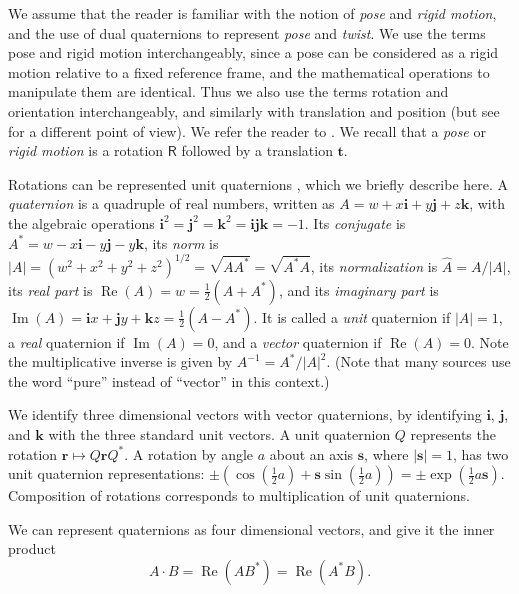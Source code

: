 \documentclass[reqno,12pt]{amsart}
\newcommand\bi{\bm i}
\newcommand\bj{\bm j}
\newcommand\bk{\bm k}
\DeclareMathOperator\realpart{Re}
\DeclareMathOperator\imagpart{Im}
\begin{document}
We assume that the reader is familiar with the notion of \emph{pose} and \emph{rigid motion}, and the use of dual quaternions to represent \emph{pose} and \emph{twist}.  We use the terms pose and rigid motion interchangeably, since a pose can be considered as a rigid motion relative to a fixed reference frame, and the mathematical operations to manipulate them are identical.  Thus we also use the terms rotation and orientation interchangeably, and similarly with translation and position (but see \cite{chirikjian-et-al} for a different point of view).  We refer the reader to \cite{adorno,agrawal,bottema-et-al,clifford,dooley-et-al,gallardo-alvarado,han-et-al,kavan-et-al,kavan-et-al-2,kenwright,kussaba-et-al,montgomery-smith-et-al,perez-et-al,schilling1,schilling2,selig-book,silva-et-al,spong-et-al,wang-et-al}.  We recall that a \emph{pose} or \emph{rigid motion} is a rotation $\mathsf R$ followed by a translation $\bm t$.

Rotations can be represented unit quaternions \cite{quaternions1,quaternions2}, which we briefly describe here.  A \emph{quaternion} is a quadruple of real numbers, written as $A = w + x \bi + y \bj + z \bk$, with the algebraic operations $\bi^2 = \bj^2 = \bk^2 = \bi \bj \bk = -1$.  Its \emph{conjugate} is $A^* = w - x \bi - y \bj - y \bk$, its \emph{norm} is $|A| = (w^2+x^2+y^2+z^2)^{1/2} = \sqrt{A A^*} = \sqrt{A^* A}$, its \emph{normalization} is $\widehat A = A/|A|$, its \emph{real part} is $\realpart(A) = w = \tfrac12(A + A^*)$, and its \emph{imaginary part} is $\imagpart(A) = \bi x + \bj y + \bk z = \tfrac12(A - A^*)$.  It is called a \emph{unit} quaternion if $|A| = 1$, a \emph{real} quaternion if $\imagpart(A) = 0$, and a \emph{vector} quaternion if $\realpart(A) = 0$.  Note the multiplicative inverse is given by $A^{-1} = A^*/|A|^2$.  (Note that many sources use the word ``pure'' instead of ``vector'' in this context.)

We identify three dimensional vectors with vector quaternions, by identifying $\bi$, $\bj$, and $\bk$ with the three standard unit vectors.  A unit quaternion $Q$ represents the rotation $\bm r \mapsto Q \bm r Q^*$.  A rotation by angle $a$ about an axis $\bm s$, where $|\bm s| = 1$, has two unit quaternion representations: $\pm(\cos(\tfrac12 a) + \bm s \sin(\tfrac12 a)) = \pm \exp(\tfrac12 a \bm s)$.  Composition of rotations corresponds to multiplication of unit quaternions.

We can represent quaternions as four dimensional vectors, and give it the inner product
\begin{equation}
A \cdot B = \realpart(A B^*) = \realpart(A^* B) .
\end{equation}
\end{document}
